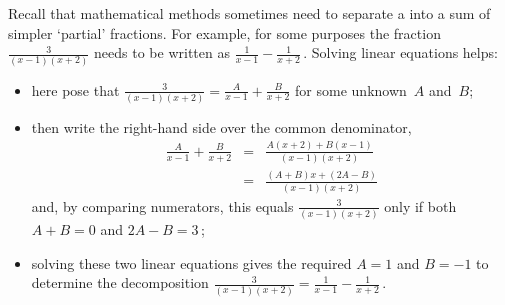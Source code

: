 \begin{reduce}
\begin{example} 
Recall that mathematical methods sometimes need to separate a  into a sum of simpler `partial' fractions.  
For example, for some purposes the fraction \(\frac3{(x-1)(x+2)}\) needs to be written as \(\frac1{x-1}-\frac1{x+2}\)\,.  
Solving linear equations helps: \begin{itemize}
\item here  pose that \(\frac3{(x-1)(x+2)} = \frac A{x-1}+\frac B{x+2}\) for some unknown~\(A\) and~\(B\); 
\item then write the right-hand side over the common denominator,
\begin{eqnarray*}
\frac A{x-1}+\frac B{x+2}
&=&\frac{A(x+2)+B(x-1)}{(x-1)(x+2)}
\\&=&\frac{(A+B)x+(2A-B)}{(x-1)(x+2)}
\end{eqnarray*}
and, by comparing numerators, this equals \(\frac3{(x-1)(x+2)}\) only if both \(A+B=0\) and \(2A-B=3\)\,; 
\item solving these two linear equations gives the required \(A=1\) and \(B=-1\) to determine the decomposition \(\frac3{(x-1)(x+2)}=\frac1{x-1}-\frac1{x+2}\)\,.
\end{itemize}



\end{example}
\end{reduce}
